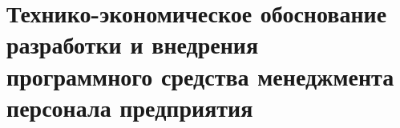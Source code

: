 \section{Технико-экономическое обоснование разработки и внедрения программного средства менеджмента персонала предприятия}
\label{sec:economics}








